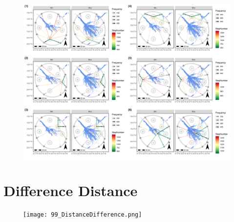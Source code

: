 \documentclass[abstract=on,10pt,a4paper,bibliography=totocnumbered]{article}
\begin{document}
\begin{figure}[htbp]
  \begin{center}
  \includegraphics[width = \textwidth]{99_IPCBuffer.png}
  \caption{}
  \label{IPCBuffer}
  \end{center}
\end{figure}

\newpage
\section{Difference Distance}
\begin{figure}[htbp]
  \begin{center}
  \texttt{[image: 99\_DistanceDifference.png]}
  \caption{}
  \label{DistanceDifference}
  \end{center}
\end{figure}

\newpage
\begingroup
\singlespacing

\endgroup
\end{document}
